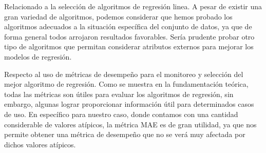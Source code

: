 Relacionado a la selección de algoritmos de regresión linea. A pesar de existir una gran variedad de algoritmos, podemos considerar que hemos probado los algoritmos adecuados a la situación específica del conjunto de datos, ya que de forma general todos arrojaron resultados favorables. Sería prudente probar otro tipo de algoritmos que permitan considerar atributos externos para mejorar los modelos de regresión.

Respecto al uso de métricas de desempeño para el monitoreo y selección del mejor algoritmo de regresión. Como se muestra en la fundamentación teórica, todas las métricas son útiles para evaluar los algoritmos de regresión, sin embargo, algunas lograr proporcionar información útil para determinados casos de uso. En específico para nuestro caso, donde contamos con una cantidad considerable de valores atípicos, la métrica MAE es de gran utilidad, ya que nos permite obtener una métrica de desempeño que no se verá muy afectada por dichos valores atípicos.
